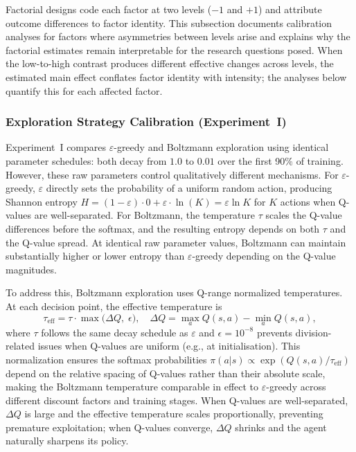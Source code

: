 Factorial designs code each factor at two levels ($-1$ and $+1$) and attribute outcome differences to factor identity. This subsection documents calibration analyses for factors where asymmetries between levels arise and explains why the factorial estimates remain interpretable for the research questions posed. When the low-to-high contrast produces different effective changes across levels, the estimated main effect conflates factor identity with intensity; the analyses below quantify this for each affected factor.

\subsubsection{Exploration Strategy Calibration (Experiment~I)}

Experiment~I compares $\varepsilon$-greedy and Boltzmann exploration using identical parameter schedules: both decay from $1.0$ to $0.01$ over the first 90\% of training. However, these raw parameters control qualitatively different mechanisms. For $\varepsilon$-greedy, $\varepsilon$ directly sets the probability of a uniform random action, producing Shannon entropy $H = (1-\varepsilon)\cdot 0 + \varepsilon \cdot \ln(K) = \varepsilon \ln K$ for $K$ actions when Q-values are well-separated. For Boltzmann, the temperature $\tau$ scales the Q-value differences before the softmax, and the resulting entropy depends on both $\tau$ and the Q-value spread. At identical raw parameter values, Boltzmann can maintain substantially higher or lower entropy than $\varepsilon$-greedy depending on the Q-value magnitudes.

To address this, Boltzmann exploration uses Q-range normalized temperatures. At each decision point, the effective temperature is
\[
  \tau_{\text{eff}} = \tau \cdot \max\bigl(\Delta Q,\; \epsilon\bigr), \quad \Delta Q = \max_a Q(s,a) - \min_a Q(s,a),
\]
where $\tau$ follows the same decay schedule as $\varepsilon$ and $\epsilon = 10^{-8}$ prevents division-related issues when Q-values are uniform (e.g., at initialisation). This normalization ensures the softmax probabilities $\pi(a|s) \propto \exp(Q(s,a)/\tau_{\text{eff}})$ depend on the relative spacing of Q-values rather than their absolute scale, making the Boltzmann temperature comparable in effect to $\varepsilon$-greedy across different discount factors and training stages. When Q-values are well-separated, $\Delta Q$ is large and the effective temperature scales proportionally, preventing premature exploitation; when Q-values converge, $\Delta Q$ shrinks and the agent naturally sharpens its policy.

